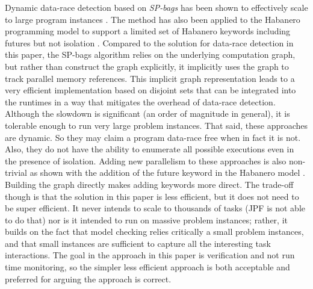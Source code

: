 Dynamic data-race detection based on \emph{SP-bags} has been shown to effectively scale to large program instances \cite{Feng1997EDD258492258493,Cheng1998DDR277651277696,Bender2004OMS10079121007933,Async-Finish-Race,Utterback2016PGP29357642935801}. The method has also been applied to the Habanero programming model to support a limited set of Habanero keywords including futures but not isolation \cite{drdForFutures,Surendran2016}. Compared to the solution for data-race detection in this paper, the SP-bags algorithm relies on the underlying computation graph, but rather than construct the graph explicitly, it implicitly uses the graph to track parallel memory references. This implicit graph representation leads to a very efficient implementation based on disjoint sets that can be integrated into the runtimes in a way that mitigates the overhead of data-race detection. Although the slowdown is significant (an order of magnitude in general), it is tolerable enough to run very large problem instances. That said, these approaches are dynamic. So they may claim a program data-race free when in fact it is not. Also, they do not have the ability to enumerate all possible executions even in the presence of isolation. Adding new parallelism to these approaches is also non-trivial as shown with the addition of the future keyword in the Habanero model \cite{drdForFutures,Surendran2016}. Building the graph directly makes adding keywords more direct. The trade-off though is that the solution in this paper is less efficient, but it does not need to be super efficient. It never intends to scale to thousands of tasks (JPF is not able to do that) nor is it intended to run on massive problem instances; rather, it builds on the fact that model checking relies critically a small problem instances, and that small instances are sufficient to capture all the interesting task interactions. The goal in the approach in this paper is verification and not run time monitoring, so the simpler less efficient approach is both acceptable and preferred for arguing the approach is correct. 

